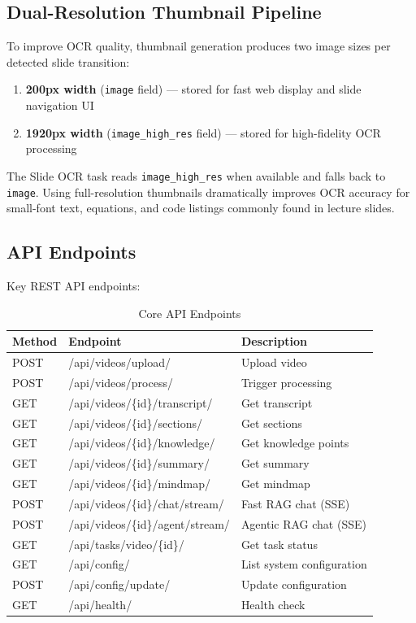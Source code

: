 \subsection{Dual-Resolution Thumbnail Pipeline}

To improve OCR quality, thumbnail generation produces two image sizes per detected slide transition:

\begin{enumerate}
    \item \textbf{200px width} (\texttt{image} field) --- stored for fast web display and slide navigation UI
    \item \textbf{1920px width} (\texttt{image\_high\_res} field) --- stored for high-fidelity OCR processing
\end{enumerate}

The Slide OCR task reads \texttt{image\_high\_res} when available and falls back to \texttt{image}. Using full-resolution thumbnails dramatically improves OCR accuracy for small-font text, equations, and code listings commonly found in lecture slides.

\subsection{API Endpoints}

Key REST API endpoints:

\begin{table}[H]
    \centering
    \caption{Core API Endpoints}
    \begin{tabular}{@{}lll@{}}
        \toprule
        \textbf{Method} & \textbf{Endpoint} & \textbf{Description} \\ \midrule
        POST & /api/videos/upload/ & Upload video \\
        POST & /api/videos/process/ & Trigger processing \\
        GET & /api/videos/\{id\}/transcript/ & Get transcript \\
        GET & /api/videos/\{id\}/sections/ & Get sections \\
        GET & /api/videos/\{id\}/knowledge/ & Get knowledge points \\
        GET & /api/videos/\{id\}/summary/ & Get summary \\
        GET & /api/videos/\{id\}/mindmap/ & Get mindmap \\
        POST & /api/videos/\{id\}/chat/stream/ & Fast RAG chat (SSE) \\
        POST & /api/videos/\{id\}/agent/stream/ & Agentic RAG chat (SSE) \\
        GET & /api/tasks/video/\{id\}/ & Get task status \\
        GET & /api/config/ & List system configuration \\
        POST & /api/config/update/ & Update configuration \\
        GET & /api/health/ & Health check \\ \bottomrule
    \end{tabular}
\end{table}

